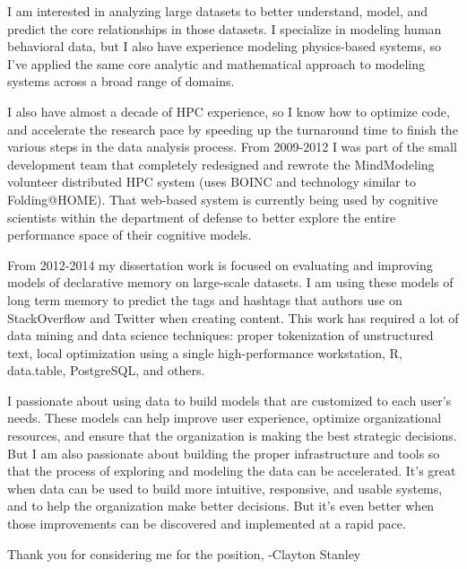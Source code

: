 \documentclass{article}
\begin{document}
I am interested in analyzing large datasets to better understand, model, and predict the core relationships in those datasets.
I specialize in modeling human behavioral data, but I also have experience modeling physics-based systems,
so I've applied the same core analytic and mathematical approach to modeling systems across a broad range of domains.

I also have almost a decade of HPC experience, so I know how to optimize code, and accelerate the research pace by speeding up the turnaround time to finish the various steps in the data analysis process. 
From 2009-2012 I was part of the small development team that completely redesigned and rewrote the MindModeling volunteer distributed HPC system (uses BOINC and technology similar to Folding@HOME).
That web-based system is currently being used by cognitive scientists within the department of defense to better explore the entire performance space of their cognitive models.

From 2012-2014 my dissertation work is focused on evaluating and improving models of declarative memory on large-scale datasets.
I am using these models of long term memory to predict the tags and hashtags that authors use on StackOverflow and Twitter when creating content.
This work has required a lot of data mining and data science techniques: proper tokenization of unstructured text, local optimization using a single high-performance workstation, R, data.table, PostgreSQL, and others.

I passionate about using data to build models that are customized to each user's needs.
These models can help improve user experience, optimize organizational resources, and ensure that the organization is making the best strategic decisions.
But I am also passionate about building the proper infrastructure and tools so that the process of exploring and modeling the data can be accelerated.
It's great when data can be used to build more intuitive, responsive, and usable systems, and to help the organization make better decisions.
But it's even better when those improvements can be discovered and implemented at a rapid pace.

Thank you for considering me for the position,
-Clayton Stanley
\end{document}
